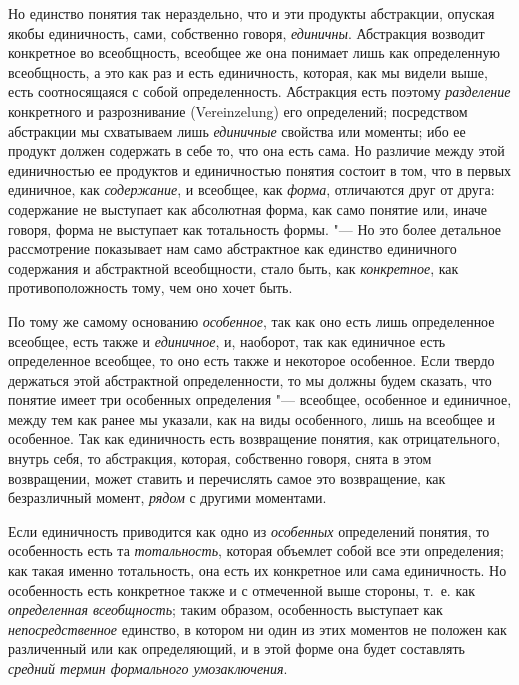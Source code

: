 Но единство понятия так нераздельно, что и эти продукты
абстракции, опуская якобы единичность, сами, собственно говоря,
{\em единичны}.
Абстракция возводит конкретное во всеобщность, всеобщее же
она понимает лишь как определенную всеобщность, а это как раз и есть
единичность, которая, как мы видели выше, есть соотносящаяся с собой
определенность. Абстракция есть поэтому
{\em разделение}
конкретного и разрознивание (Vereinzelung) его
определений; посредством абстракции мы схватываем лишь
{\em единичные} свойства
или моменты; ибо ее продукт должен содержать в себе то, что она есть сама.
Но различие между этой единичностью ее продуктов и единичностью понятия
состоит в том, что в первых единичное, как
{\em содержание}, и
всеобщее, как {\em форма},
отличаются друг от друга: содержание не выступает как
абсолютная форма, как само понятие или, иначе говоря, форма не выступает
как тотальность формы. "--- Но это более детальное рассмотрение
показывает нам само абстрактное как единство единичного содержания и
абстрактной всеобщности, стало быть, как
{\em конкретное}, как
противоположность тому, чем оно хочет быть.

По тому же самому основанию
{\em особенное}, так как
оно есть лишь определенное всеобщее, есть также и
{\em единичное}, и,
наоборот, так как единичное есть определенное всеобщее, то оно есть также и
некоторое особенное. Если твердо держаться этой абстрактной определенности,
то мы должны будем сказать, что понятие имеет три особенных
определения "--- всеобщее, особенное и
единичное, между тем как ранее мы указали, как на виды особенного, лишь на
всеобщее и особенное. Так как единичность есть возвращение понятия, как
отрицательного, внутрь себя, то абстракция, которая, собственно говоря,
снята в этом возвращении, может ставить и перечислять самое это
возвращение, как безразличный момент,
{\em рядом} с другими моментами.

Если единичность приводится как одно из
{\em особенных}
определений понятия, то особенность есть та
{\em тотальность},
которая объемлет собой все эти определения; как такая именно
тотальность, она есть их конкретное или сама единичность. Но особенность
есть конкретное также и с отмеченной выше стороны, т.~е. как
{\em определенная всеобщность};
таким образом, особенность выступает как
{\em непосредственное}
единство, в котором ни один из этих моментов не положен как
различенный или как определяющий, и в этой форме она будет составлять
{\em средний термин формального умозаключения}.

